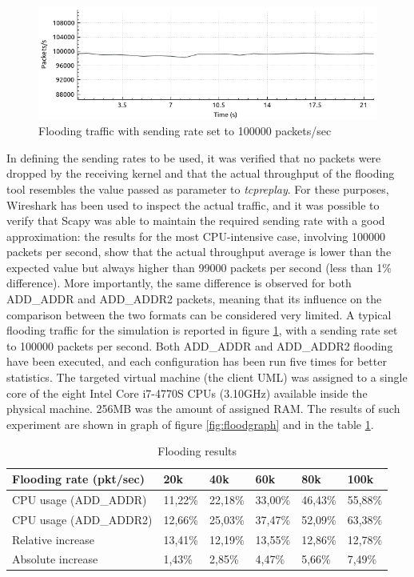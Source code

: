 \begin{figure}[!htb]
\centering
\includegraphics[width=\textwidth]{images/wirethrough}
\caption{Flooding traffic with sending rate set to 100000 packets/sec}
\label{fig:sendgraph}
\end{figure} 

In defining the sending rates to be used, it was verified that no packets were dropped by the receiving kernel and that the actual throughput of the flooding tool resembles the value passed as parameter to \textit{tcpreplay}. For these purposes, Wireshark has been used to inspect the actual traffic, and it was possible to verify that Scapy was able to maintain the required sending rate with a good approximation: the results for the most CPU-intensive case, involving 100000 packets per second, show that the actual throughput average is lower than the expected value but always higher than 99000 packets per second (less than 1\% difference). More importantly, the same difference is observed for both ADD\_ADDR and ADD\_ADDR2 packets, meaning that its influence on the comparison between the two formats can be considered very limited. A typical flooding traffic for the simulation is reported in figure \ref{fig:sendgraph}, with a sending rate set to 100000 packets per second. Both ADD\_ADDR and ADD\_ADDR2 flooding have been executed, and each configuration has been run five times for better statistics. The targeted virtual machine (the client UML) was assigned to a single core of the eight Intel Core i7-4770S CPUs (3.10GHz) available inside the physical machine. 256MB was the amount of assigned RAM. The results of such experiment are shown in graph of figure \ref{fig:floodgraph} and in the table \ref{table:floodtable}.

\begin{table}[h!]
\centering
\begin{tabular}{ |p{4.8cm}|p{1.2cm}|p{1.2cm}|p{1.2cm}|p{1.2cm}|p{1.2cm}|   }
\hline
Flooding rate (pkt/sec) &20k&40k&60k&80k&100k \\
\hline
CPU usage (ADD\_ADDR) & 11,22\% & 22,18\% & 33,00\% & 46,43\% & 55,88\% \\
CPU usage (ADD\_ADDR2) & 12,66\% & 25,03\% & 37,47\% & 52,09\% & 63,38\% \\
Relative increase & 13,41\% & 12,19\% & 13,55\% & 12,86\% & 12,78\% \\
Absolute increase & 1,43\% & 2,85\% & 4,47\% & 5,66\% & 7,49\% \\
\hline
\end{tabular}
\caption{Flooding results}
\label{table:floodtable}
\end{table}


